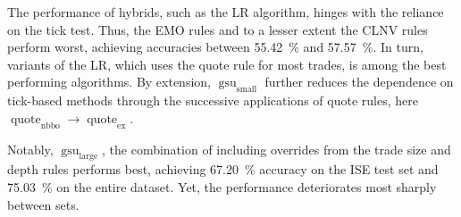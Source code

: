 The performance of hybrids, such as the \gls{LR} algorithm, hinges with the reliance on the tick test. Thus, the \gls{EMO} rules and to a lesser extent the \gls{CLNV} rules perform worst, achieving accuracies between \SI{55.42}{\percent} and \SI{57.57}{\percent}. In turn, variants of the \gls{LR}, which uses the quote rule for most trades, is among the best performing algorithms. By extension, $\operatorname{gsu}_{\mathrm{small}}$ further reduces the dependence on tick-based methods through the successive applications of quote rules, here $\operatorname{quote}_{\mathrm{nbbo}} \to \operatorname{quote}_{\mathrm{ex}}$.

Notably, $\operatorname{gsu}_{\mathrm{large}}$, the combination of \textcite[][33]{grauerOptionTradeClassification2022} including overrides from the trade size and depth rules performs best, achieving \SI{67.20}{\percent} accuracy on the \gls{ISE} test set and \SI{75.03}{\percent} on the entire dataset. Yet, the performance deteriorates most sharply between sets.

